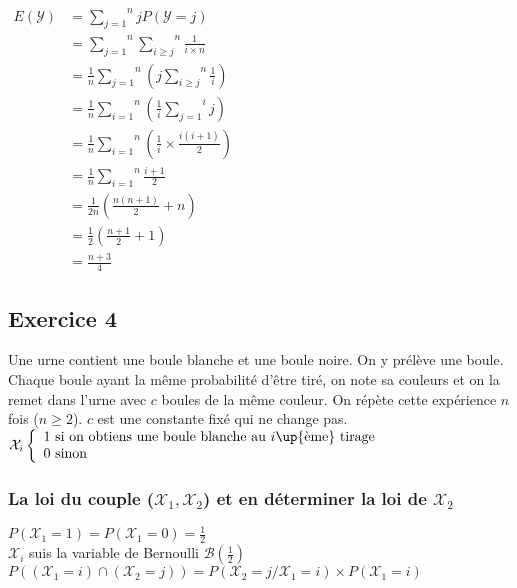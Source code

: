 \documentclass[a4paper, 12pt]{article}
\begin{document}
$
\begin{aligned}
E (\mathcal{Y}) &= \overset{n}{\underset{j = 1}{\sum}} j P (\mathcal{Y} = j) \\
&= \overset{n}{\underset{j = 1}{\sum}} \overset{n}{\underset{i \geq j}{\sum}} \frac{1}{i \times n} \\
&= \frac{1}{n} \overset{n}{\underset{j = 1}{\sum}} (j \overset{n}{\underset{i \geq j}{\sum}} \frac{1}{i}) \\
&= \frac{1}{n} \overset{n}{\underset{i = 1}{\sum}} (\frac{1}{i} \overset{i}{\underset{j = 1}{\sum}} j) \\
&= \frac{1}{n} \overset{n}{\underset{i = 1}{\sum}} (\frac{1}{i} \times \frac{i (i + 1)}{2}) \\
&= \frac{1}{n} \overset{n}{\underset{i = 1}{\sum}} \frac{i + 1}{2} \\
&= \frac{1}{2n} (\frac{n(n + 1)}{2} + n) \\
&= \frac{1}{2} (\frac{n + 1}{2} + 1) \\
&\boxed{= \frac{n + 3}{4}}
\end{aligned}
$


\subsection{Exercice 4}
Une urne contient une boule blanche et une boule noire. On y prélève une boule. Chaque boule ayant la même probabilité d'être tiré, on note sa couleurs et on la remet dans l'urne avec $c$ boules de la même couleur. On répète cette expérience $n$ fois ($n \geq 2$). $c$ est une constante fixé qui ne change pas.\\
$\mathcal{X}_i
\left \{
\begin{array}{l}
1 \text{ si on obtiens une boule blanche au } i\text{\up{ème} tirage} \\
0 \text{ sinon}
\end{array}
\right .
$
\subsubsection{La loi du couple ($\mathcal{X}_1, \mathcal{X}_2$) et en déterminer la loi de $\mathcal{X}_2$}
$P (\mathcal{X}_1 = 1) = P (\mathcal{X}_1 = 0) = \frac{1}{2}$ \\
$\mathcal{X}_i$ suis la variable de Bernoulli $\mathcal{B} (\frac{1}{2})$ \\
$P ((\mathcal{X}_1 = i) \cap (\mathcal{X}_2 = j)) = P (\mathcal{X}_2 = j / \mathcal{X}_1 = i) \times P (\mathcal{X}_1 = i)$ \\
\end{document}
